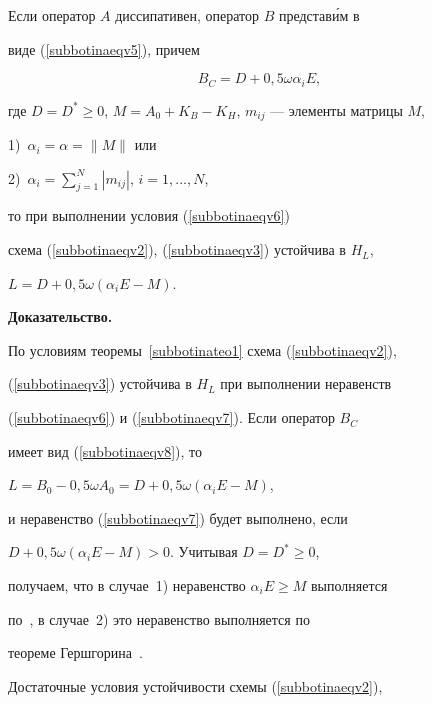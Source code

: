 \begin{cornonum}


Если оператор $A$ диссипативен, оператор $B$ представ\'им в 


виде (\ref{subbotinaeqv5}), причем


\begin{equation} \label{subbotinaeqv8}


B_C= D+0{,}5\omega \alpha_i E,


\end{equation}


где $D=D^* \ge 0$, $M=A_0+K_B - K_H$, $m_{ij}$ --- элементы матрицы $M$,


1)~$\alpha _i =\alpha =\| M \|$ или


2)~$\alpha _i =\sum\limits_{j=1}^N |m_{ij}|$, $i=1,\dotsc,N$,


то при выполнении условия (\ref{subbotinaeqv6}) 


схема (\ref{subbotinaeqv2}), (\ref{subbotinaeqv3}) устойчива в $H_L$,


$L=D+0{,}5 \omega \left({\alpha_i E-M} \right)$.


\end{cornonum}





{\bf Доказательство.}


По условиям теоремы~\ref{subbotinateo1} схема (\ref{subbotinaeqv2}),


(\ref{subbotinaeqv3}) устойчива в $H_L$ при выполнении неравенств


(\ref{subbotinaeqv6}) и (\ref{subbotinaeqv7}). Если оператор $B_C$


имеет вид (\ref{subbotinaeqv8}), то


$L=B_0-0{,}5\omega A_0=D+0{,}5\omega \left({\alpha_i E-M} \right)$,


и неравенство (\ref{subbotinaeqv7}) будет выполнено, если


$D+0{,}5\omega \left({\alpha_i E-M} \right)>0$. Учитывая $D=D^* \ge 0$,


получаем, что в случае~1) неравенство $\alpha_i E \ge M$ выполняется 


по~\cite{subbotinabib9}, в случае~2) это неравенство выполняется по 


теореме Гершгорина~\cite{subbotinabib10}.





Достаточные условия устойчивости схемы (\ref{subbotinaeqv2}),


